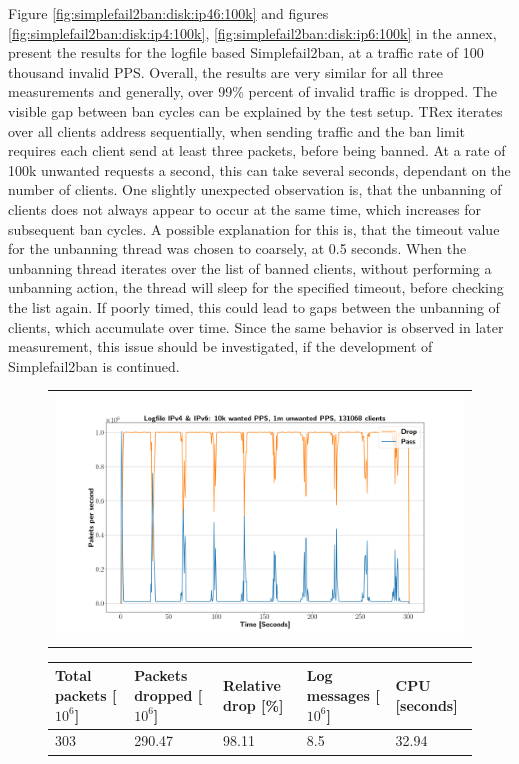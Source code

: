 Figure \ref{fig:simplefail2ban:disk:ip46:100k} and figures \ref{fig:simplefail2ban:disk:ip4:100k}, \ref{fig:simplefail2ban:disk:ip6:100k} in the annex, present the results
for the logfile based Simplefail2ban, at a traffic rate of 100 thousand invalid \ac{PPS}. Overall, the results are very similar for all three measurements and generally, over 99\% percent of invalid traffic is dropped.
The visible gap between ban cycles can be explained by the test setup. TRex iterates over all clients address sequentially, when sending traffic and the ban limit requires each client
send at  least three packets, before being banned. At a rate of 100k unwanted requests a second, this can take several seconds, dependant on the number of clients.
One slightly unexpected observation is, that the unbanning of clients does not always appear to occur at the same time, which increases for subsequent ban cycles.
A possible explanation for this is, that the timeout value for the unbanning thread was chosen to coarsely, at 0.5 seconds. When the unbanning
thread iterates over the list of banned clients, without performing a unbanning action, the thread will sleep for the specified timeout,
before checking the list again. If poorly timed, this could lead to gaps between the unbanning of clients, which accumulate over time. Since the same
behavior is observed in later measurement, this issue should be investigated, if the development of Simplefail2ban is continued.   \\  

\begin{figure}[!h]
	\centering
	\scriptsize
	\begin{tabular}{c}
    	\centerline{\includegraphics[width=1.2\textwidth]{images/simplefail2ban_disk_ipv46_v10k_iv1m_c131068.png}}
	\end{tabular}
	\begin{tabular}{lllll}
		\toprule
		\textbf{Total packets [$10^6$]} & \textbf{Packets dropped [$10^6$]} & \textbf{Relative drop [\%]} & \textbf{Log messages [$10^6$]} & \textbf{CPU [seconds]} \\ \midrule 
		303 & 290.47 & 98.11 & 8.5 & 32.94 \\
	\bottomrule
	\end{tabular}
	\caption[Simplefail2ban, Logfile IPv4 \& IPv6, 1m \ac{PPS}]{}
	\label{fig:simplefail2ban:disk:ip46:1m}
\end{figure}

